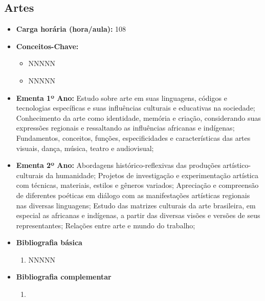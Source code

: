 \documentclass[11pt,fleqn]{book} %
\begin{document}
\subsection{Artes}\label{disc:artes}
\begin{itemize}
	\item \textbf{Carga horária (hora/aula):} 108
	\item \textbf{Conceitos-Chave:}
	\begin{itemize}
		\item NNNNN
		\item NNNNN
	\end{itemize}

	\item \textbf{Ementa 1º Ano:}
	Estudo sobre arte em suas linguagens, códigos e tecnologias específicas e suas influências culturais e educativas na sociedade;
	Conhecimento da arte como identidade, memória e criação, considerando suas expressões regionais e ressaltando as influências africanas e indígenas;
	Fundamentos, conceitos, funções, especificidades e características das artes visuais, dança, música, teatro e audiovisual;
	\item \textbf{Ementa 2º Ano:}
	Abordagens histórico-reflexivas das produções artístico-culturais da humanidade;
	Projetos de investigação e experimentação artística com técnicas, materiais, estilos e gêneros variados;
	Apreciação e compreensão de diferentes poéticas em diálogo com as manifestações artísticas regionais nas diversas linguagens;
	Estudo das matrizes culturais da arte brasileira, em especial as africanas e indígenas, a partir das diversas visões e versões de seus representantes;
	Relações entre arte e mundo do trabalho;
	\item \textbf{Bibliografia básica}
	\begin{enumerate}
		\item NNNNN
	\end{enumerate}
	\item \textbf{Bibliografia complementar}
	\begin{enumerate}
		\item 
	\end{enumerate}	
\end{itemize}

\newpage
\end{document}
